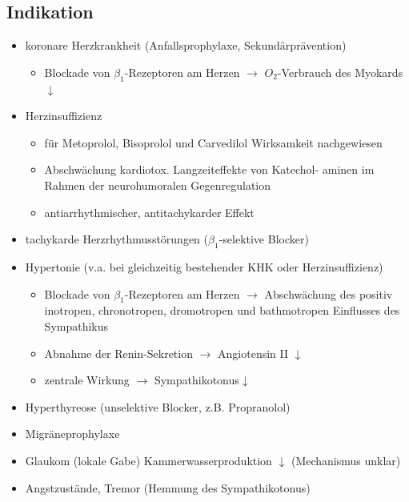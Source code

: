 \documentclass[10pt,a4paper]{report}
\begin{document}
\subsection{Indikation}
\begin{itemize}
	\item koronare Herzkrankheit (Anfallsprophylaxe, Sekundärprävention)
	\begin{itemize}
		\item Blockade von $\beta_1$-Rezeptoren am Herzen $\rightarrow$ $O_2$-Verbrauch des Myokards $\downarrow$
	\end{itemize}			
	\item Herzinsuffizienz 		
	\begin{itemize}
		\item für Metoprolol, Bisoprolol und Carvedilol Wirksamkeit 				  nachgewiesen
		\item Abschwächung kardiotox. Langzeiteffekte von Katechol-		  aminen im Rahmen der neurohumoralen Gegenregulation
		\item antiarrhythmischer, antitachykarder Effekt
	\end{itemize}			
	\item tachykarde Herzrhythmusstörungen	($\beta_1$-selektive Blocker)
	\item Hypertonie 	(v.a. bei gleichzeitig bestehender KHK oder Herzinsuffizienz)
	\begin{itemize}
		\item Blockade von $\beta_1$-Rezeptoren am Herzen $\rightarrow$ Abschwächung			des positiv inotropen, chronotropen, dromotropen und bathmotropen Einflusses des Sympathikus
		\item Abnahme der Renin-Sekretion $\rightarrow$ Angiotensin II $\downarrow$
		\item zentrale Wirkung $\rightarrow$ Sympathikotonus$\downarrow$
	\end{itemize}
	\item Hyperthyreose 	(unselektive Blocker, z.B. Propranolol)
	\item Migräneprophylaxe 	
	\item Glaukom (lokale Gabe)	Kammerwasserproduktion  $\downarrow$ (Mechanismus unklar)
	\item Angstzustände, Tremor (Hemmung des Sympathikotonus)	
\end{itemize}
\end{document}
